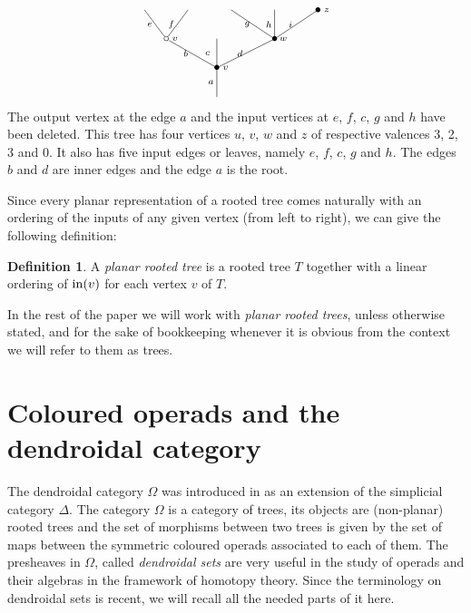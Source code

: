 \documentclass[a4paper]{amsart}
\theoremstyle{plain}
\theoremstyle{definition}
\newtheorem{dfn}[thm]{Definition}
\theoremstyle{remark}
\numberwithin{equation}{section}
\numberwithin{figure}{section}
\begin{document}
\begin{equation}
    \xy
<0.08cm, 0cm>:
(0.0, 0.0)*{}="1"; %
(0.0, 10.0)*=0{\bullet}="2"; %
(-17.5, 20.0)*{\circ}="3"; %
(-25.0, 30.0)*{}="4"; %
(-10.0, 30.0)*{}="5"; %
(0, 20.0)*{}="6"; %
(20.0, 20.0)*=0{\bullet}="7"; %
(5.0, 30.0)*{}="8"; %
(20.0, 30.0)*{}="9"; %
(35.0, 30.0)*=0{\bullet}="10"; %
"1";"2" **\dir{-};
"2";"3" **\dir{-};
"3";"4" **\dir{-};
"3";"5" **\dir{-};
"2";"6" **\dir{-};
"2";"7" **\dir{-};
"7";"8" **\dir{-};
"7";"9" **\dir{-};
"7";"10" **\dir{-};
(3.0, 10.0)*=0{\scriptstyle v};
(-14.5, 20.0)*=0{\scriptstyle v};
(23.0, 20.0)*=0{\scriptstyle w};
(38.0, 30.0)*=0{\scriptstyle z};
(-2.0, 5.0)*=0{\scriptstyle a};
(-10.75, 15.0)*=0{\scriptstyle b};
(-23.25, 25.0)*=0{\scriptstyle e};
(-15.75, 25.0)*=0{\scriptstyle f};
(-3.25, 15.0)*=0{\scriptstyle c};
(8.0, 15.0)*=0{\scriptstyle d};
(10.5, 25.0)*=0{\scriptstyle g};
(18.0, 25.0)*=0{\scriptstyle h};
(25.5, 25.0)*=0{\scriptstyle i};
\endxy
    \label{treeexample}
\end{equation}
The output vertex at the edge $a$ and the input vertices at $e$, $f$, $c$, $g$ and $h$ have been deleted.
This tree has four vertices $u$, $v$, $w$ and $z$ of respective valences 3, 2, 3 and 0. It also has five input
edges or leaves, namely $e$, $f$, $c$, $g$ and $h$. The edges $b$ and $d$ are inner edges and the edge $a$ is the root.

Since every planar representation of a rooted tree
comes naturally with an ordering of the inputs of any given vertex
(from left to right), we can give the following definition:

\begin{dfn}
    A \emph{planar rooted tree} is a rooted tree $T$ together with a linear ordering of
    $\operatorname{in}(v)$ for each vertex $v$ of $T$.
\end{dfn}

In the rest of the paper we will work with \emph{planar rooted trees}, unless otherwise stated, and for the sake of
bookkeeping whenever it is obvious from the context we will refer to them as trees.

\section{Coloured operads and the dendroidal category}
The dendroidal category $\Omega$ was introduced in \cite{Wei07,
    moerdijkweiss} as an extension of the simplicial category $\Delta$.
The category $\Omega$ is a category of trees, its objects are
(non-planar) rooted trees and the set of morphisms between two trees
is given by the set of maps between the symmetric coloured operads
associated to each of them. The presheaves in $\Omega$, called
\emph{dendroidal sets} are very useful in the study of operads and
their algebras in the framework of homotopy theory. Since the
terminology on dendroidal sets is  recent, we will recall all the
needed parts of it here.
\end{document}
